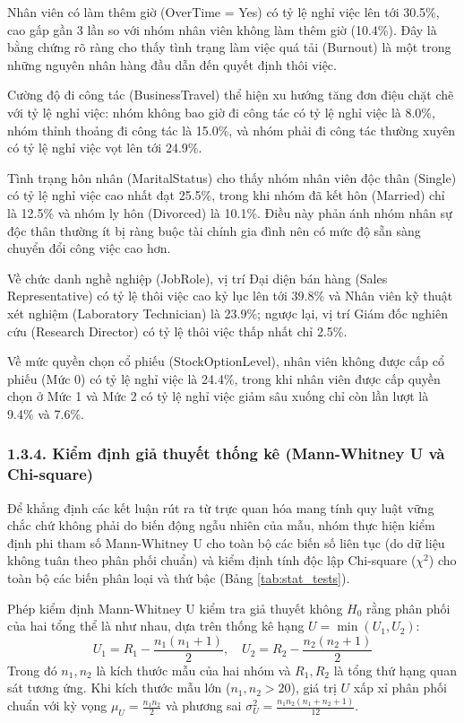 \documentclass[12pt,a4paper]{article}
\begin{document}
Nhân viên có làm thêm giờ (OverTime = Yes) có tỷ lệ nghỉ việc lên tới 30.5\%, cao gấp gần 3 lần so với nhóm nhân viên không làm thêm giờ (10.4\%). Đây là bằng chứng rõ ràng cho thấy tình trạng làm việc quá tải (Burnout) là một trong những nguyên nhân hàng đầu dẫn đến quyết định thôi việc.

Cường độ đi công tác (BusinessTravel) thể hiện xu hướng tăng đơn điệu chặt chẽ với tỷ lệ nghỉ việc: nhóm không bao giờ đi công tác có tỷ lệ nghỉ việc là 8.0\%, nhóm thỉnh thoảng đi công tác là 15.0\%, và nhóm phải đi công tác thường xuyên có tỷ lệ nghỉ việc vọt lên tới 24.9\%.

Tình trạng hôn nhân (MaritalStatus) cho thấy nhóm nhân viên độc thân (Single) có tỷ lệ nghỉ việc cao nhất đạt 25.5\%, trong khi nhóm đã kết hôn (Married) chỉ là 12.5\% và nhóm ly hôn (Divorced) là 10.1\%. Điều này phản ánh nhóm nhân sự độc thân thường ít bị ràng buộc tài chính gia đình nên có mức độ sẵn sàng chuyển đổi công việc cao hơn.

Về chức danh nghề nghiệp (JobRole), vị trí Đại diện bán hàng (Sales Representative) có tỷ lệ thôi việc cao kỷ lục lên tới 39.8\% và Nhân viên kỹ thuật xét nghiệm (Laboratory Technician) là 23.9\%; ngược lại, vị trí Giám đốc nghiên cứu (Research Director) có tỷ lệ thôi việc thấp nhất chỉ 2.5\%.

Về mức quyền chọn cổ phiếu (StockOptionLevel), nhân viên không được cấp cổ phiếu (Mức 0) có tỷ lệ nghỉ việc là 24.4\%, trong khi nhân viên được cấp quyền chọn ở Mức 1 và Mức 2 có tỷ lệ nghỉ việc giảm sâu xuống chỉ còn lần lượt là 9.4\% và 7.6\%.

\subsubsection{1.3.4. Kiểm định giả thuyết thống kê (Mann-Whitney U và Chi-square)}
Để khẳng định các kết luận rút ra từ trực quan hóa mang tính quy luật vững chắc chứ không phải do biến động ngẫu nhiên của mẫu, nhóm thực hiện kiểm định phi tham số Mann-Whitney U cho toàn bộ các biến số liên tục (do dữ liệu không tuân theo phân phối chuẩn) và kiểm định tính độc lập Chi-square ($\chi^2$) cho toàn bộ các biến phân loại và thứ bậc (Bảng \ref{tab:stat_tests}).

Phép kiểm định Mann-Whitney U kiểm tra giả thuyết không $H_0$ rằng phân phối của hai tổng thể là như nhau, dựa trên thống kê hạng $U = \min(U_1, U_2)$:
\begin{equation}
U_1 = R_1 - \frac{n_1(n_1+1)}{2}, \quad U_2 = R_2 - \frac{n_2(n_2+1)}{2}
\end{equation}
Trong đó $n_1, n_2$ là kích thước mẫu của hai nhóm và $R_1, R_2$ là tổng thứ hạng quan sát tương ứng. Khi kích thước mẫu lớn ($n_1, n_2 > 20$), giá trị $U$ xấp xỉ phân phối chuẩn với kỳ vọng $\mu_U = \frac{n_1 n_2}{2}$ và phương sai $\sigma_U^2 = \frac{n_1 n_2 (n_1 + n_2 + 1)}{12}$.
\end{document}
